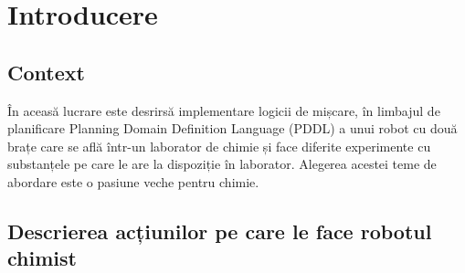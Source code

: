 
\section{Introducere}

\subsection{Context }
    În aceasă lucrare este desrirsă implementare logicii de mișcare, în limbajul de planificare Planning Domain Definition Language (PDDL) a unui robot cu două brațe care se află într-un laborator de chimie și face diferite experimente cu substanțele pe care le are la dispoziție în laborator. Alegerea acestei teme de abordare este o pasiune veche pentru chimie. 
 \newline


\subsection{Descrierea acțiunilor pe care le face robotul chimist}
    
